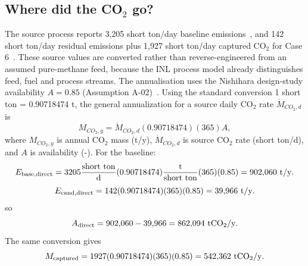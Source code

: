 \subsection{Where did the CO$_2$ go?}
The source process reports 3,205 short ton/day baseline emissions~\cite{inltev953}, and 142 short ton/day residual emissions plus 1,927 short ton/day captured CO$_2$ for Case 6~\cite{inltev961}. These source values are converted rather than reverse-engineered from an assumed pure-methane feed, because the INL process model already distinguishes feed, fuel and process streams. The annualisation uses the Nishihara design-study availability $A=0.85$ (Assumption A-02)~\cite{nishihara2007potential}. Using the standard conversion 1 short ton = 0.90718474 t, the general annualization for a source daily CO$_2$ rate $\dot M_{CO_2,d}$ is
\begin{equation}\label{eq:co2-annual-general}
M_{CO_2,y}=\dot M_{CO_2,d}(0.90718474)(365)A,
\end{equation}
where $M_{CO_2,y}$ is annual CO$_2$ mass (t/y), $\dot M_{CO_2,d}$ is source CO$_2$ rate (short ton/d), and $A$ is availability (-). For the baseline:
\begin{equation}\label{eq:base-direct}
E_{\rm base,direct}=3205\frac{\mathrm{short\ ton}}{\mathrm d}
(0.90718474)\frac{\mathrm t}{\mathrm{short\ ton}}(365)(0.85)
=902{,}060~\mathrm{t/y}.
\end{equation}
\begin{equation}\label{eq:cand-direct}
E_{\rm cand,direct}=142(0.90718474)(365)(0.85)
=39{,}966~\mathrm{t/y}.
\end{equation}
so
\begin{equation}\label{eq:direct-avoided}
A_{\rm direct}=902{,}060-39{,}966=862{,}094~\mathrm{tCO_2/y}.
\end{equation}
The same conversion gives
\begin{equation}\label{eq:captured-annual}
M_{\rm captured}=1927(0.90718474)(365)(0.85)
=542{,}362~\mathrm{tCO_2/y}.
\end{equation}

